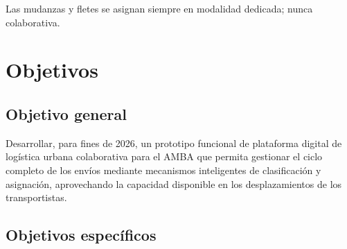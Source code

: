 Las mudanzas y fletes se asignan siempre en modalidad dedicada; nunca colaborativa.

\section{Objetivos}

\subsection{Objetivo general}

Desarrollar, para fines de 2026, un prototipo funcional de plataforma digital de logística urbana colaborativa para el AMBA que permita gestionar el ciclo completo de los envíos mediante mecanismos inteligentes de clasificación y asignación, aprovechando la capacidad disponible en los desplazamientos de los transportistas.

\subsection{Objetivos específicos}

